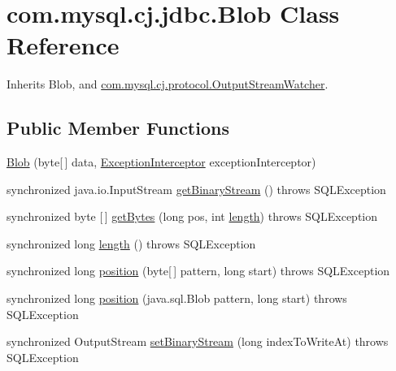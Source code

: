 \hypertarget{classcom_1_1mysql_1_1cj_1_1jdbc_1_1_blob}{}\section{com.\+mysql.\+cj.\+jdbc.\+Blob Class Reference}
\label{classcom_1_1mysql_1_1cj_1_1jdbc_1_1_blob}


Inherits Blob, and \mbox{\hyperlink{interfacecom_1_1mysql_1_1cj_1_1protocol_1_1_output_stream_watcher}{com.\+mysql.\+cj.\+protocol.\+Output\+Stream\+Watcher}}.

\subsection*{Public Member Functions}
\begin{DoxyCompactItemize}
\item 
\mbox{\hyperlink{classcom_1_1mysql_1_1cj_1_1jdbc_1_1_blob_afe5823f0f28d6eb7ceac45199d57b31c}{Blob}} (byte\mbox{[}$\,$\mbox{]} data, \mbox{\hyperlink{interfacecom_1_1mysql_1_1cj_1_1exceptions_1_1_exception_interceptor}{Exception\+Interceptor}} exception\+Interceptor)
\item 
synchronized java.\+io.\+Input\+Stream \mbox{\hyperlink{classcom_1_1mysql_1_1cj_1_1jdbc_1_1_blob_a1a540e23ff3d83e99a0eb47352f685e1}{get\+Binary\+Stream}} ()  throws S\+Q\+L\+Exception 
\item 
synchronized byte \mbox{[}$\,$\mbox{]} \mbox{\hyperlink{classcom_1_1mysql_1_1cj_1_1jdbc_1_1_blob_a44a60687141a091417374ef214a24000}{get\+Bytes}} (long pos, int \mbox{\hyperlink{classcom_1_1mysql_1_1cj_1_1jdbc_1_1_blob_a21cf04a4632ad74337cf8a867bae61e3}{length}})  throws S\+Q\+L\+Exception 
\item 
synchronized long \mbox{\hyperlink{classcom_1_1mysql_1_1cj_1_1jdbc_1_1_blob_a21cf04a4632ad74337cf8a867bae61e3}{length}} ()  throws S\+Q\+L\+Exception 
\item 
synchronized long \mbox{\hyperlink{classcom_1_1mysql_1_1cj_1_1jdbc_1_1_blob_a8894fdeb0a15e17b7375c5234b4bb1b2}{position}} (byte\mbox{[}$\,$\mbox{]} pattern, long start)  throws S\+Q\+L\+Exception 
\item 
synchronized long \mbox{\hyperlink{classcom_1_1mysql_1_1cj_1_1jdbc_1_1_blob_ae44b30a5b6688e357cdb7cd4c459e20e}{position}} (java.\+sql.\+Blob pattern, long start)  throws S\+Q\+L\+Exception 
\item 
synchronized Output\+Stream \mbox{\hyperlink{classcom_1_1mysql_1_1cj_1_1jdbc_1_1_blob_abbef32522fa0951a0e417442c36ff0b1}{set\+Binary\+Stream}} (long index\+To\+Write\+At)  throws S\+Q\+L\+Exception 

\end{DoxyCompactItemize}
